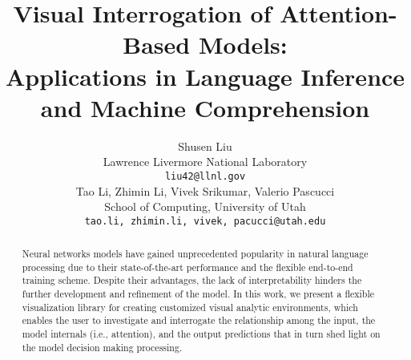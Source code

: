 \documentclass[11pt,a4paper]{article}
\title{Visual Interrogation of Attention-Based Models: \\ Applications in Language Inference and Machine Comprehension}
\author{Shusen Liu \\
  Lawrence Livermore National Laboratory\\
  {\tt liu42@llnl.gov} \\\And
  Tao Li,  Zhimin Li,  Vivek Srikumar, Valerio Pascucci \\
  School of Computing, University of Utah\\
    {\tt {tao.li, zhimin.li, vivek, pacucci}@utah.edu}
}
\date{}
\begin{document}
\maketitle

\begin{abstract}
Neural networks models have gained unprecedented popularity in natural language processing due to their state-of-the-art performance and the flexible end-to-end training scheme. Despite their advantages, the lack of interpretability hinders the further development and refinement of the model.
%
In this work, we present a flexible visualization library for creating customized visual analytic environments, which enables the user to investigate and interrogate the relationship among the input, the model internals (i.e., attention), and the output predictions that in turn shed light on the model decision making processing.
 
\end{abstract}









\end{document}
